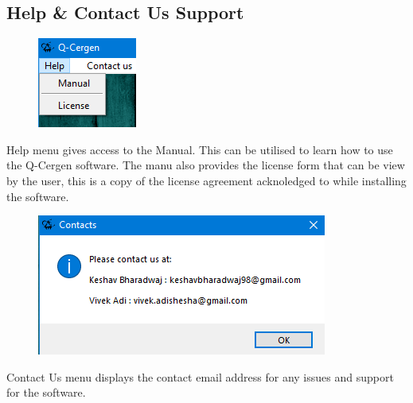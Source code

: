 \addappheadtotoc
\begin{appendices}
\chapter{Help \& Contact Us Support}

\begin{figure}[H]
	\centering
	\includegraphics[width=0.35\linewidth]{"images/generation_qr_nqr/Screenshot (102)"}
	\label{fig:screenshot-102}
\end{figure}

Help menu gives access to the Manual. This can be utilised to learn how to use the Q-Cergen software. The manu also provides the license form that can be view by the user, this is a copy of the license agreement acknoledged to while installing the software.

\begin{figure}[H]
	\centering
	\includegraphics[width=0.75\linewidth]{"images/generation_qr_nqr/Screenshot (103)"}
	\label{fig:screenshot-103}
\end{figure}

Contact Us menu displays the contact email address for any issues and support for the software.


\end{appendices}
